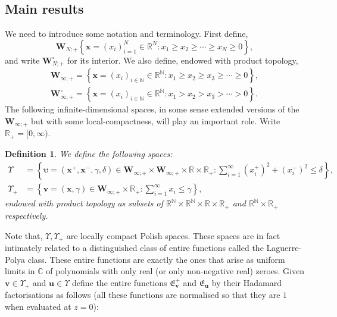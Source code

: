\documentclass[]{article}
\newtheorem{defn}[thm]{Definition}
\begin{document}
\subsection{Main results}
 We need to introduce some notation and terminology. First define,
\begin{equation*}
\mathbf{W}_{N;+}\left\{\mathbf{x}=(x_i)_{i=1}^N\in \mathbb{R}^{N}:x_1\ge x_2 \ge \cdots \ge x_N\ge 0\right\},
\end{equation*}
and write $\mathbf{W}_{N;+}^\circ$ for its interior. We also define, endowed with product topology,
\begin{align*}
\mathbf{W}_{\infty;+}=\left\{\mathbf{x}=(x_i)_{i\in \mathbb{N}}\in \mathbb{R}^{\mathbb{N}}:x_1\ge x_2\ge x_3 \ge \cdots \ge 0\right\},\\
\mathbf{W}_{\infty;+}^\circ=\left\{\mathbf{x}=(x_i)_{i\in \mathbb{N}}\in \mathbb{R}^{\mathbb{N}}:x_1> x_2> x_3 > \cdots >0\right\}.
\end{align*}
The following infinite-dimensional spaces, in some sense extended versions of the $\mathbf{W}_{\infty;+}$ but with some local-compactness, will play an important role. Write $\mathbb{R}_+=[0,\infty)$.
\begin{defn} We define the following spaces:
\begin{align} 
\Upsilon&=\left\{\boldsymbol{\upsilon}=(\mathbf{x}^+,\mathbf{x}^-,\gamma,\delta)\in \mathbf{W}_{\infty;+}\times \mathbf{W}_{\infty;+}\times \mathbb{R}\times \mathbb{R}_+:\sum_{i=1}^\infty (x_i^+)^2+(x_i^-)^2\le \delta\right\},\label{Ypsilon}\\
\Upsilon_+&=\left\{\boldsymbol{v}=(\mathbf{x},\gamma)\in \mathbf{W}_{\infty;+}\times \mathbb{R}_+: \sum_{i=1}^\infty x_i\le \gamma \right\},\label{Ypsilon+}
\end{align}
endowed with product topology as subsets of $\mathbb{R}^{\mathbb{N}}\times \mathbb{R}^{\mathbb{N}}\times \mathbb{R}\times \mathbb{R}_+$ and $\mathbb{R}^{\mathbb{N}}\times \mathbb{R}_+$ respectively.
\end{defn}
Note that, $\Upsilon, \Upsilon_+$ are locally compact Polish spaces. These spaces are in fact intimately related to a distinguished class of entire functions called the Laguerre-Polya class. These entire functions are exactly the ones that arise as uniform limits in $\mathbb{C}$ of polynomials with only real (or only non-negative real) zeroes. Given $\boldsymbol{v} \in \Upsilon_+$  and $\boldsymbol{u}\in \Upsilon$  define the entire functions $\mathfrak{E}_{\boldsymbol{v}}^+$ and $\mathfrak{E}_{\boldsymbol{u}}$ by their Hadamard factorisations as follows (all these functions are normalised so that they are $1$ when evaluated at $z=0$):
\end{document}
